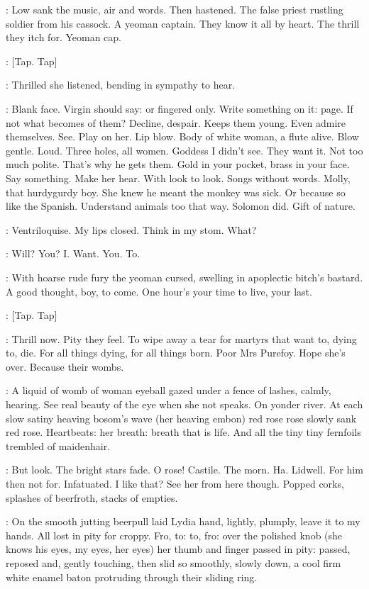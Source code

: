 :
Low sank the music,
air and words.
Then hastened.
The false priest
rustling soldier from his cassock.
A yeoman captain.
They know it all by
heart.
The thrill they itch for.
Yeoman cap.

\stripling:
[Tap.
Tap]

:
Thrilled she listened,
bending in sympathy to hear.

\BloomInt:
Blank face.
Virgin should say:
or fingered only.
Write something on
it:
page.
If not what becomes of them?
Decline,
despair.
Keeps them young.
Even admire themselves.
See.
Play on her.
Lip blow.
Body of white woman,
a flute alive.
Blow gentle.
Loud.
Three holes,
all women.
Goddess I didn't
see.
They want it.
Not too much polite.
That's why he gets them.
Gold in
your pocket,
brass in your face.
Say something.
Make her hear.
With look
to look.
Songs without words.
Molly,
that hurdygurdy boy.
She knew he
meant the monkey was sick.
Or because so like the Spanish.
Understand
animals too that way.
Solomon did.
Gift of nature.

\BloomInt:
Ventriloquise.
My lips closed.
Think in my stom.
What?

\BloomInt:
Will?
You?
I.
Want.
You.
To.

:
With hoarse rude fury the yeoman cursed,
swelling in apoplectic
bitch's bastard.
A good thought,
boy,
to come.
One hour's your time to
live,
your last.

\stripling:
[Tap.
Tap]

\BloomInt:
Thrill now.
Pity they feel.
To wipe away a tear for martyrs that want
to,
dying to,
die.
For all things dying,
for all things born.
Poor Mrs
Purefoy.
Hope she's over.
Because their wombs.

\BloomInt:
A liquid of womb of woman eyeball gazed under a fence of lashes,
calmly,
hearing.
See real beauty of the eye when she not speaks.
On yonder
river.
At each slow satiny heaving bosom's wave (her heaving embon) red
rose rose slowly sank red rose.
Heartbeats:
her breath:
breath that is
life.
And all the tiny tiny fernfoils trembled of maidenhair.

\BloomInt:
But look.
The bright stars fade.
O rose!
Castile.
The morn.
Ha.
Lidwell.
For him then not for.
Infatuated.
I like that?
See her
from here though.
Popped corks,
splashes of beerfroth,
stacks of empties.

:
On the smooth jutting beerpull laid Lydia hand,
lightly,
plumply,
leave
it to my hands.
All lost in pity for croppy.
Fro,
to:
to,
fro:
over the
polished knob (she knows his eyes,
my eyes,
her eyes) her thumb and finger
passed in pity:
passed,
reposed and,
gently touching,
then slid so
smoothly,
slowly down,
a cool firm white enamel baton protruding through
their sliding ring.

